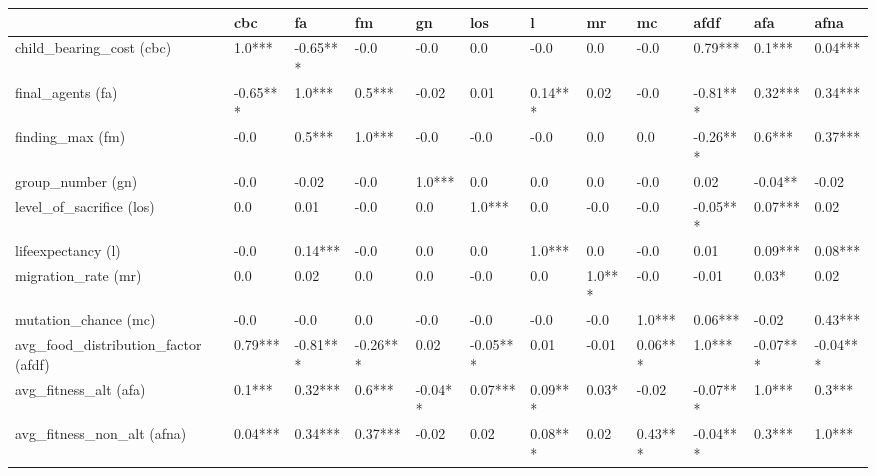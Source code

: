 \begin{tabular}{llllllllllll}
\toprule
{} &       cbc &        fa &        fm &       gn &       los &        l &      mr &       mc &      afdf &       afa &      afna  \\
\midrule
child\_bearing\_cost (cbc)            &    1.0*** &  -0.65*** &      -0.0 &     -0.0 &       0.0 &     -0.0 &     0.0 &     -0.0 &   0.79*** &    0.1*** &   0.04***  \\
final\_agents (fa)                   &  -0.65*** &    1.0*** &    0.5*** &    -0.02 &      0.01 &  0.14*** &    0.02 &     -0.0 &  -0.81*** &   0.32*** &   0.34***  \\
finding\_max (fm)                    &      -0.0 &    0.5*** &    1.0*** &     -0.0 &      -0.0 &     -0.0 &     0.0 &      0.0 &  -0.26*** &    0.6*** &   0.37***  \\
group\_number (gn)                   &      -0.0 &     -0.02 &      -0.0 &   1.0*** &       0.0 &      0.0 &     0.0 &     -0.0 &      0.02 &   -0.04** &     -0.02  \\
level\_of\_sacrifice (los)            &       0.0 &      0.01 &      -0.0 &      0.0 &    1.0*** &      0.0 &    -0.0 &     -0.0 &  -0.05*** &   0.07*** &      0.02  \\
lifeexpectancy (l)                  &      -0.0 &   0.14*** &      -0.0 &      0.0 &       0.0 &   1.0*** &     0.0 &     -0.0 &      0.01 &   0.09*** &   0.08***  \\
migration\_rate (mr)                 &       0.0 &      0.02 &       0.0 &      0.0 &      -0.0 &      0.0 &  1.0*** &     -0.0 &     -0.01 &     0.03* &      0.02  \\
mutation\_chance (mc)                &      -0.0 &      -0.0 &       0.0 &     -0.0 &      -0.0 &     -0.0 &    -0.0 &   1.0*** &   0.06*** &     -0.02 &   0.43***  \\
avg\_food\_distribution\_factor (afdf) &   0.79*** &  -0.81*** &  -0.26*** &     0.02 &  -0.05*** &     0.01 &   -0.01 &  0.06*** &    1.0*** &  -0.07*** &  -0.04***  \\
avg\_fitness\_alt (afa)               &    0.1*** &   0.32*** &    0.6*** &  -0.04** &   0.07*** &  0.09*** &   0.03* &    -0.02 &  -0.07*** &    1.0*** &    0.3***  \\
avg\_fitness\_non\_alt (afna)          &   0.04*** &   0.34*** &   0.37*** &    -0.02 &      0.02 &  0.08*** &    0.02 &  0.43*** &  -0.04*** &    0.3*** &    1.0***  \\
\bottomrule
\end{tabular}
